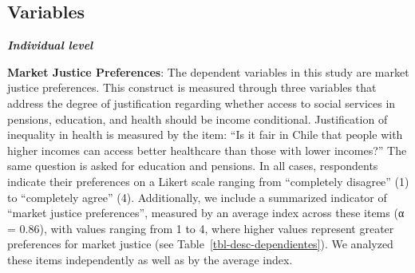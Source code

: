 \documentclass[
    behavsci,
    article,
    submit,
moreauthors
]{mdpi}
\begin{document}
\subsection{Variables}\label{variables}

\textbf{\emph{Individual level}}

\textbf{Market Justice Preferences}: The dependent variables in this
study are market justice preferences. This construct is measured through
three variables that address the degree of justification regarding
whether access to social services in pensions, education, and health
should be income conditional. Justification of inequality in health is
measured by the item: ``Is it fair in Chile that people with higher
incomes can access better healthcare than those with lower incomes?''
The same question is asked for education and pensions. In all cases,
respondents indicate their preferences on a Likert scale ranging from
``completely disagree'' (1) to ``completely agree'' (4). Additionally,
we include a summarized indicator of ``market justice preferences'',
measured by an average index across these items (α = 0.86), with values
ranging from 1 to 4, where higher values represent greater preferences
for market justice (see Table~\ref{tbl-desc-dependientes}). We analyzed
these items independently as well as by the average index.
\end{document}

